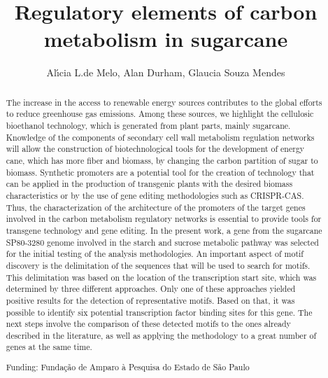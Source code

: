 \documentclass[twoside]{article}
\title{\vspace{-15mm}\fontsize{24pt}{10pt}\selectfont\textbf{ Regulatory elements of carbon metabolism in sugarcane }} %
\author{ Al\'{\i}cia L.de Melo, Alan Durham, Glaucia Souza Mendes }
\affil{  }
\date{}
\begin{document}
  
  
  \maketitle %
  
  
  \thispagestyle{fancy} %
  
  
  \begin{abstract}
  The increase in the access to renewable energy sources contributes to the global efforts to reduce greenhouse gas emissions. Among these sources,  we highlight the cellulosic bioethanol technology,  which is generated from plant parts,  mainly sugarcane. Knowledge of the components of secondary cell wall metabolism regulation networks will allow the construction of biotechnological tools for the development of energy cane,  which has more fiber and biomass,  by changing the carbon partition of sugar to biomass. Synthetic promoters are a potential tool for the creation of technology that can be applied in the production of transgenic plants with the desired biomass characteristics or by the use of gene editing methodologies such as CRISPR-CAS. Thus,  the characterization of the architecture of the promoters of the target genes involved in the carbon metabolism regulatory networks is essential to provide tools for transgene technology and gene editing. In the present work,  a gene from the sugarcane SP80-3280 genome involved in the starch and sucrose metabolic pathway was selected for the initial testing of the analysis methodologies. An important aspect of motif discovery is the delimitation of the sequences that will be used to search for motifs. This delimitation was based on the location of the transcription start site,  which was determined by three different approaches. Only one of these approaches yielded positive results for the detection of representative motifs. Based on that,  it was possible to identify six potential transcription factor binding sites for this gene. The next steps involve the comparison of these detected motifs to the ones already described in the literature,  as well as applying the methodology to a great number of genes at the same time.
  
  Funding: Funda\c{c}\~ao de Amparo \`a Pesquisa do Estado de S\~ao Paulo \\ 
  \end{abstract}
  
\end{document}
